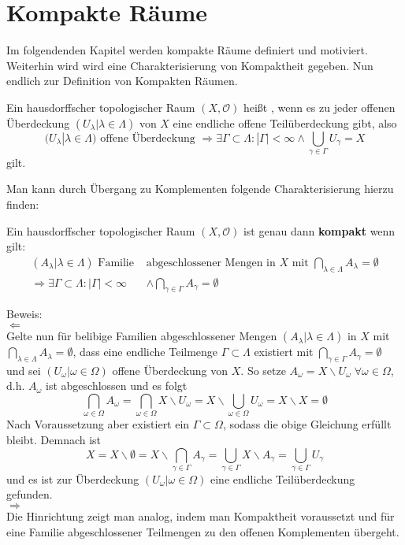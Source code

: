 \chapter{Kompakte Räume}
Im folgendenden Kapitel werden kompakte Räume definiert und motiviert. Weiterhin wird 
wird eine Charakterisierung von Kompaktheit gegeben.
Nun endlich zur Definition von Kompakten Räumen.

\begin{Def}[Kompaktheit]
	Ein hausdorffscher topologischer Raum \((X, \mathcal{O})\) heißt , wenn es zu jeder offenen Überdeckung 
	\((U_{\lambda} | \lambda \in \Lambda)\) von \(X\) eine endliche offene Teilüberdeckung gibt, also
	\[ (U_{\lambda} | \lambda \in \Lambda) \mbox{ offene Überdeckung }
     \Rightarrow \exists \Gamma \subset \Lambda : |\Gamma| < \infty \land \bigcup_{\gamma \in \Gamma} U_{\gamma} = X \] 
	gilt.
\end{Def}
Man kann durch Übergang zu Komplementen folgende Charakterisierung hierzu finden:

\begin{Satz}
	Ein hausdorffscher topologischer Raum \((X, \mathcal{O})\) ist genau dann {\bf kompakt } wenn gilt:
	\begin{align*}
		(A_{\lambda}| \lambda \in \Lambda) \mbox{ Familie } & \mbox{abgeschlossener Mengen in } X \mbox{ mit } 
		\bigcap_{\lambda \in \Lambda} A_{\lambda} = \emptyset \\
		\Rightarrow \exists \Gamma \subset \Lambda : |\Gamma| < \infty & \land \bigcap_{\gamma \in \Gamma} A_{\gamma} = \emptyset
	\end{align*} 
\end{Satz}

Beweis:
\\
\(\Leftarrow\)
\\
Gelte nun für belibige Familien abgeschlossener Mengen \((A_{\lambda}| \lambda \in \Lambda)\) in  \(X\) mit
\(\bigcap_{\lambda \in \Lambda} A_{\lambda} = \emptyset\), dass eine endliche Teilmenge \(\Gamma \subset \Lambda\) existiert mit
\(\bigcap_{\gamma \in \Gamma} A_{\gamma} = \emptyset\) und sei \( (U_{\omega} | \omega \in \Omega) \) offene Überdeckung
von \(X\). So setze \(A_{\omega} = X \backslash U_{\omega} \; \forall \omega \in \Omega\), d.h. \(A_{\omega}\) ist abgeschlossen
und es folgt 
\[\bigcap_{\omega \in \Omega} A_{\omega} = \bigcap_{\omega \in \Omega} X \backslash U_{\omega} =  X \backslash 
\bigcup_{\omega \in \Omega} U_{\omega} = X \backslash X =  \emptyset \]
Nach Voraussetzung aber existiert ein \(\Gamma \subset \Omega\), sodass die obige Gleichung erfüllt bleibt. Demnach ist 
\[ X = X \backslash \emptyset = X \backslash \bigcap_{\gamma \in \Gamma} A_{\gamma} = \bigcup_{\gamma \in \Gamma} X \backslash A_{\gamma} = 
\bigcup_{\gamma \in \Gamma} U_{\gamma} \]
 und es ist zur Überdeckung \( (U_{\omega} | \omega \in \Omega) \) eine endliche Teilüberdeckung gefunden.
 \\
 \(\Rightarrow\)
 \\
 Die Hinrichtung zeigt man analog, indem man Kompaktheit voraussetzt und für eine Familie abgeschlossener Teilmengen zu den 
 offenen Komplementen übergeht.

